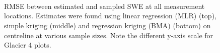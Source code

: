 \documentclass[12pt]{article}
\begin{document}
\begin{figure}[H]
	\centering
	\\
	\\
	\\
	\caption{RMSE between estimated and sampled SWE at all measurement locations. Estimates were found using linear regression (MLR) (top), simple kriging (middle) and regression kriging (BMA) (bottom) on centreline at various sample sizes. Note the different y-axis scale for Glacier 4 plots.}
	\label{fig:SubsetRMSE_samplesizeNdensity_centreline}
\end{figure}


\end{document}
